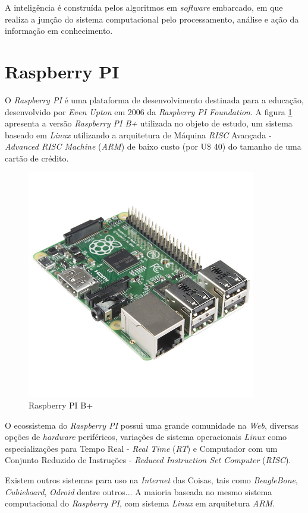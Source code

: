 A inteligência é construída pelos algoritmos em \textit{software} embarcado, em
que realiza a junção do sistema computacional pelo processamento, análise e
ação da informação em conhecimento.

\section{Raspberry PI}

O \textit{Raspberry PI} é uma plataforma de desenvolvimento destinada para a
educação, desenvolvido por \textit{Even Upton} em 2006 da \textit{Raspberry PI
  Foundation}. A figura \ref{fig:raspberrypi} apresenta a versão
\textit{Raspberry PI B+} utilizada no objeto de estudo, um sistema baseado em
\textit{Linux} utilizando a arquitetura de Máquina \textit{RISC} Avançada -
\textit{Advanced RISC Machine} (\textit{ARM}) de baixo custo (por U\$ 40) do
tamanho de uma cartão de crédito.

\begin{figure}[H]
    \centering
    \includegraphics[width=10cm, height=10cm]{figuras/raspberrypi}
    \caption{Raspberry PI B+}
    \label{fig:raspberrypi}
\end{figure}

O ecossistema do \textit{Raspberry PI} possui uma grande comunidade na
\textit{Web}, diversas opções de \textit{hardware} periféricos, variações de
sistema operacionais \textit{Linux} como especializações para Tempo Real -
\textit{Real Time} (\textit{RT}) e Computador com um Conjunto Reduzido de
Instruções - \textit{Reduced Instruction Set Computer} (\textit{RISC}).

Existem outros sistemas para uso na \textit{Internet} das Coisas, tais como
\textit{BeagleBone}, \textit{Cubieboard}, \textit{Odroid} dentre outros... A
maioria baseada no mesmo sistema computacional do \textit{Raspberry PI}, com
sistema \textit{Linux} em arquitetura \textit{ARM}.
